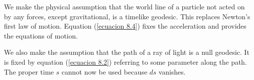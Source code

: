 We make the physical assumption that the world line of a particle not acted on 
by any forces, except gravitational, is a timelike geodesic. This replaces 
Newton's first law of motion. Equation (\ref{ecuacion 8.4}) fixes the 
acceleration and provides the equations of motion.

We also make the assumption that the path of a ray of light is a null geodesic. 
It is fixed by equation (\ref{ecuacion 8.2}) referring to some parameter along 
the path. The proper time $s$ cannot now be used because $ds$ vanishes.

